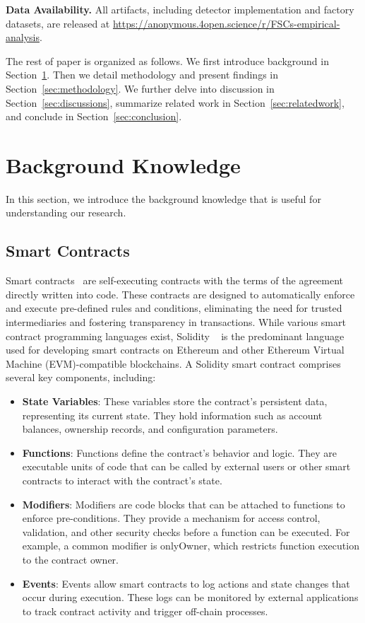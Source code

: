 \documentclass[acmsmall, screen]{acmart}
\begin{document}
	\noindent
	\textbf{Data Availability.} All artifacts, including detector implementation and factory
	datasets, are released at \url{https://anonymous.4open.science/r/FSCs-empirical-analysis}.

	The rest of paper is organized as follows. We first introduce background in Section~\ref{sec:background}.
	Then we detail methodology and present findings in Section~\ref{sec:methodology}. We further
	delve into discussion in Section~\ref{sec:discussions}, summarize related work in Section~\ref{sec:relatedwork},
	and conclude in Section~\ref{sec:conclusion}.

	\section{Background Knowledge}
	\label{sec:background} In this section, we introduce the background knowledge that is useful for
	understanding our research.

	\subsection{Smart Contracts}
	Smart contracts~\cite{smartcontract} are self-executing contracts with the terms of the agreement
	directly written into code. These contracts are designed to automatically enforce and execute
	pre-defined rules and conditions, eliminating the need for trusted intermediaries and fostering transparency
	in transactions. While various smart contract programming languages exist, Solidity ~\cite{solidity}
	is the predominant language used for developing smart contracts on Ethereum and other Ethereum
	Virtual Machine (EVM)-compatible blockchains. A Solidity smart contract comprises several key components,
	including:
	\begin{itemize}[leftmargin=0.4cm,topsep=0.1cm]
		\item \textbf{State Variables}: These variables store the contract's persistent data,
		representing its current state. They hold information such as account balances,
		ownership records, and configuration parameters.

		\item \textbf{Functions}: Functions define the contract's behavior and logic. They are
		executable units of code that can be called by external users or other smart contracts
		to interact with the contract's state.

		\item \textbf{Modifiers}: Modifiers are code blocks that can be attached to functions to enforce
		pre-conditions. They provide a mechanism for access control, validation, and other
		security checks before a function can be executed. For example, a common modifier is
		onlyOwner, which restricts function execution to the contract owner.

		\item \textbf{Events}: Events allow smart contracts to log actions and state changes that occur
		during execution. These logs can be monitored by external applications to track contract
		activity and trigger off-chain processes.
	\end{itemize}
\end{document}
